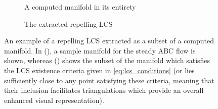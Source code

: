 \begin{figure}[htpb]
    \centering
    \begin{subfigure}[b]{0.475\textwidth}
        \centering
        \caption[]{{\small A computed manifold in its entirety}}
        \label{fig:mf_conversion_mf}
    \end{subfigure}
    \begin{subfigure}[b]{0.475\textwidth}
        \centering
        \caption[]{{\small The extracted repelling LCS}}
        \label{fig:mf_conversion_lcs}
    \end{subfigure}
    \caption[An example of a repelling LCS extracted as a subset of a computed
    manifold]
    {An example of a repelling LCS extracted as a subset of a computed manifold.
        In (), a sample manifold for the steady
        ABC flow is shown, whereas () shows the
        subset of the manifold which satisfies the LCS existence criteria
        given in \cref{eq:lcs_conditions} (or lies sufficiently close to any point
        satisfying these criteria, meaning that their inclusion facilitates
    triangulations which provide an overall enhanced visual representation).}
    \label{fig:manifold_lcs_conversion}
\end{figure}

